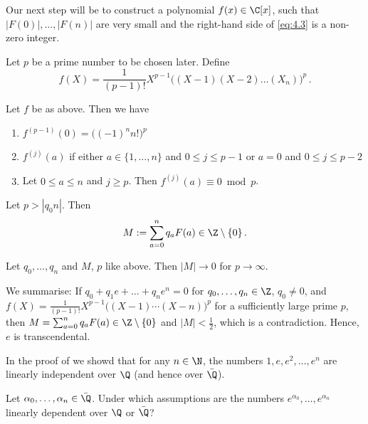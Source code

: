 Our next step will be to construct a polynomial \( f(x) \in \C[x] \), such that \( |F(0)|, \dotsc, |F(n)| \) are very small and the right-hand side of \eqref{eq:4.3} is a non-zero integer.

Let \( p \) be a prime number to be chosen later.
Define
\[ f(X) = \frac{1}{(p-1)!} X^{p-1} \big( (X-1) (X-2) \dotsc (X_n) \big)^p \,. \]

\begin{lem}
	Let \( f \) be as above.
	Then we have
	\begin{enumerate}[label=(\roman*)]
		\item \( f^{(p-1)}(0) = \big( (-1)^n n! \big)^p \)
		\item \( f^{(j)} (a) \) if either \( a \in \{1, \dotsc, n\} \) and \( 0 \leq j \leq p-1 \) or \( a=0 \) and \( 0 \leq j \leq p-2 \)
		\item Let \( 0 \leq a \leq n \) and \( j \geq p \). Then \( f^{(j)}(a) \equiv 0 \bmod p \).
	\end{enumerate}
\end{lem}

\begin{lem}
	Let \( p > |q_0 n| \).
	Then
	\[ M := \sum_{a=0}^{n} q_a F(a) \in \Z \setminus \{0\} \,. \]
\end{lem}

\begin{lem}
	Let \( q_0, \dotsc, q_n \) and \( M \), \( p \) like above.
	Then \( |M| \to 0 \) for \( p \to \infty \).
\end{lem}

We summarise: If \( q_0 + q_1e + \dots + q_ne^n = 0 \) for \( q_0, \dotsc, q_n \in \Z \), \( q_0 \neq 0 \), and \( f(X) = \frac{1}{(p-1)!} X^{p-1} \big( (X-1) \dotsm (X-n) \big)^p \) for a sufficiently large prime \( p \), then \( M = \sum_{a=0}^{n} q_a F(a) \in \Z \setminus \{0\} \) and \( |M| < \frac{1}{2} \), which is a contradiction.
Hence, \( e \) is transcendental.

\begin{rem*}
	In the proof of  we showd that for any \( n \in \N \), the numbers \( 1, e, e^2, \dotsc, e^n \) are linearly independent over \( \Q \) (and hence over \( \bar{\Q} \)). 
\end{rem*}

\begin{frage*}
	Let \( \alpha_0, \dotsc, \alpha_n \in \bar{\Q} \).
	Under which assumptions are the numbers \( e^{\alpha_0}, \dotsc, e^{\alpha_n} \) linearly dependent over \( \Q \) or \( \bar{\Q} \)?
\end{frage*}

